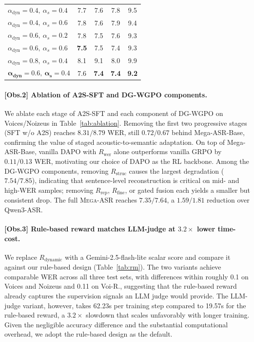 \documentclass{article}
\begin{document}
\begin{table}[t]
\begin{minipage}[t]{0.5\linewidth}
\begin{tabular}{lcccc}
\midrule
$\alpha_{\text{dyn}}{=}0.4,\ \alpha_s{=}0.4$ & 7.7 & 7.6 & 7.8 & 9.5 \\
$\alpha_{\text{dyn}}{=}0.4,\ \alpha_s{=}0.6$ & 7.8 & 7.6 & 7.9 & 9.4 \\
$\alpha_{\text{dyn}}{=}0.6,\ \alpha_s{=}0.2$ & 7.8 & 7.5 & 7.6 & 9.3 \\
$\alpha_{\text{dyn}}{=}0.6,\ \alpha_s{=}0.6$ & \textbf{7.5} & 7.5 & 7.4 & 9.3 \\
$\alpha_{\text{dyn}}{=}0.8,\ \alpha_s{=}0.4$ & 8.1 & 9.1 & 8.0 & 9.9 \\
$\boldsymbol{\alpha_{\text{dyn}}{=}0.6,\ \alpha_s{=}0.4}$ & 7.6 & \textbf{7.4} & \textbf{7.4} & \textbf{9.2} \\
\bottomrule
\end{tabular}
\end{minipage}
\vspace{-3mm}
\end{table}

\vspace{-2mm}

\paragraph{\textbf{[Obs.2] Ablation of A2S-SFT and DG-WGPO components.}}
We ablate each stage of A2S-SFT and each component of DG-WGPO on Voices/Noizeus in Table~\ref{tab:ablation}. Removing the first two progressive stages (SFT w/o A2S) reaches $8.31/8.79$ WER, still $0.72/0.67$ behind Mega-ASR-Base, confirming the value of staged acoustic-to-semantic adaptation. On top of Mega-ASR-Base, vanilla DAPO with $R_{\text{wer}}$ alone outperforms vanilla GRPO by $0.11/0.13$ WER, motivating our choice of DAPO as the RL backbone. Among the DG-WGPO components, removing $R_{\text{struc}}$ causes the largest degradation ($7.54/7.85$), indicating that sentence-level reconstruction is critical on mid- and high-WER samples; removing $R_{\text{rep}}$, $R_{\text{fine}}$, or gated fusion each yields a smaller but consistent drop. The full \textsc{Mega-ASR} reaches $7.35/7.64$, a $1.59/1.81$ reduction over Qwen3-ASR.

\vspace{-2mm}
\paragraph{\textbf{[Obs.3] Rule-based reward matches LLM-judge at $3.2\times$ lower time-cost.}}
We replace $R_\text{dynamic}$ with a Gemini-2.5-flash-lite scalar score and compare it against our rule-based design (Table~\ref{tab:rm}). The two variants achieve comparable WER across all three test sets, with differences within roughly 0.1 on Voices and Noizeus and 0.11 on Voi-R., suggesting that the rule-based reward already captures the supervision signals an LLM judge would provide. The LLM-judge variant, however, takes 62.23s per training step compared to 19.57s for the rule-based reward, a $3.2\times$ slowdown that scales unfavorably with longer training. Given the negligible accuracy difference and the substantial computational overhead, we adopt the rule-based design as the default.
\end{document}
